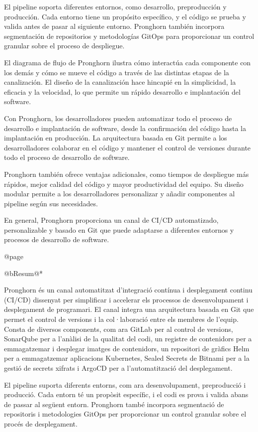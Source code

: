 El pipeline soporta diferentes entornos, como desarrollo, preproducción y producción. Cada entorno tiene un propósito específico, y el código se prueba y valida antes de pasar al siguiente entorno. Pronghorn también incorpora segmentación de repositorios y metodologías GitOps para proporcionar un control granular sobre el proceso de despliegue.

El diagrama de flujo de Pronghorn ilustra cómo interactúa cada componente con los demás y cómo se mueve el código a través de las distintas etapas de la canalización. El diseño de la canalización hace hincapié en la simplicidad, la eficacia y la velocidad, lo que permite un rápido desarrollo e implantación del software.

Con Pronghorn, los desarrolladores pueden automatizar todo el proceso de desarrollo e implantación de software, desde la confirmación del código hasta la implantación en producción. La arquitectura basada en Git permite a los desarrolladores colaborar en el código y mantener el control de versiones durante todo el proceso de desarrollo de software.

Pronghorn también ofrece ventajas adicionales, como tiempos de despliegue más rápidos, mejor calidad del código y mayor productividad del equipo. Su diseño modular permite a los desarrolladores personalizar y añadir componentes al pipeline según sus necesidades.

En general, Pronghorn proporciona un canal de CI/CD automatizado, personalizable y basado en Git que puede adaptarse a diferentes entornos y procesos de desarrollo de software.

@page

@b{Resum}@*


Pronghorn és un canal automatitzat d'integració contínua i desplegament continu (CI/CD) dissenyat per simplificar i accelerar els processos de desenvolupament i desplegament de programari. El canal integra una arquitectura basada en Git que permet el control de versions i la col·laboració entre els membres de l'equip. Consta de diversos components, com ara GitLab per al control de versions, SonarQube per a l'anàlisi de la qualitat del codi, un registre de contenidors per a emmagatzemar i desplegar imatges de contenidors, un repositori de gràfics Helm per a emmagatzemar aplicacions Kubernetes, Sealed Secrets de Bitnami per a la gestió de secrets xifrats i ArgoCD per a l'automatització del desplegament.

El pipeline suporta diferents entorns, com ara desenvolupament, preproducció i producció. Cada entorn té un propòsit específic, i el codi es prova i valida abans de passar al següent entorn. Pronghorn també incorpora segmentació de repositoris i metodologies GitOps per proporcionar un control granular sobre el procés de desplegament.

